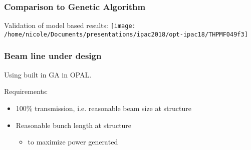 \documentclass[professionalfonts,t]{beamer}
\newcommand\Wider[2][3em]{%
	\makebox[\linewidth][c]{%
		\begin{minipage}{\dimexpr\textwidth+#1\relax}
			\raggedright#2
		\end{minipage}%
	}%
}
\begin{document}
\begin{frame}
	\frametitle{Comparison to Genetic Algorithm}
	Validation of model based results:
	\centering
	\texttt{[image: /home/nicole/Documents/presentations/ipac2018/opt-ipac18/THPMF049f3]}
\end{frame}



\begin{frame}
\frametitle{Beam line under design}
\Wider[4em]{

\begin{center}
\begin{tikzpicture}[scale=\textwidth/26cm, text=black]

\end{tikzpicture}
\end{center}

}
\vspace{-1em}

Using built in GA in OPAL.

\vspace{0.5em}
Requirements:
\begin{itemize}
	\item 100\% transmission, i.e. reasonable beam size at structure
	\item Reasonable bunch length at structure
	\begin{itemize}
		\item to maximize power generated
	\end{itemize}
\end{itemize}

\end{frame}





\end{document}
